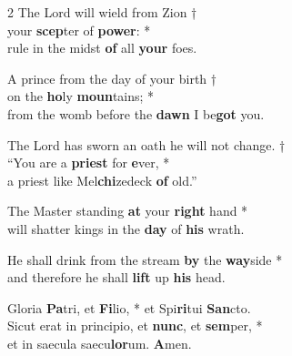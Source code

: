 \begin{multicols}{2}
    \small
    The Lord will wield from Zion †\\
    your \textbf{scep}ter of \textbf{power}: *\\
    rule in the midst \textbf{of} all \textbf{your} foes.
    
    A prince from the day of your birth †\\
    on the \textbf{ho}ly \textbf{moun}tains; *\\
    from the womb before the \textbf{dawn} I be\textbf{got} you.
    
    The Lord has sworn an oath he will not change. †\\
    “You are a \textbf{priest} for \textbf{e}ver, *\\
    a priest like Mel\textbf{chi}zedeck \textbf{of} old.”
    
    The Master standing \textbf{at} your \textbf{right} hand *\\
    will shatter kings in the \textbf{day} of \textbf{his} wrath.
    
    He shall drink from the stream \textbf{by} the \textbf{way}side *\\
    and therefore he shall \textbf{lift} up \textbf{his} head.
    
    Gloria \textbf{Pa}tri, et \textbf{Fi}lio, * et Spi\textbf{ri}tui \textbf{San}cto. \\
    Sicut erat in principio, et \textbf{nunc}, et \textbf{sem}per, *\\
    et in saecula saecu\textbf{lor}um. \textbf{A}men.\\    
\end{multicols}
